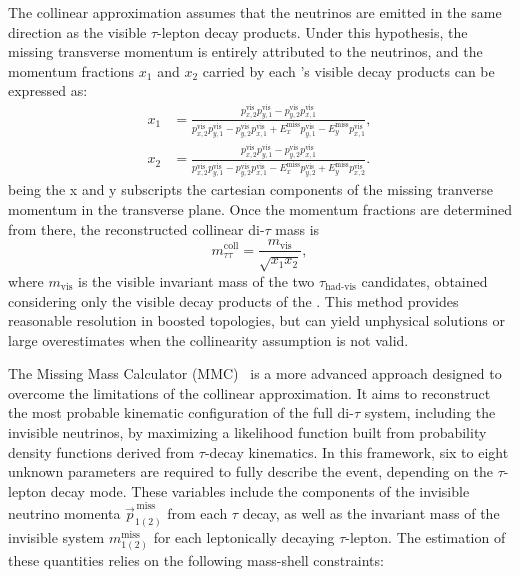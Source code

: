 The collinear approximation assumes that the neutrinos are emitted in the same direction as the visible $\tau$-lepton decay products. Under this hypothesis, the missing transverse momentum is entirely attributed to the neutrinos, and the momentum fractions $x_1$ and $x_2$ carried by each \taul's visible decay products can be expressed as: 
\begin{align}
    x_{1} &= 
    \frac{p_{x,2}^{\text{vis}} p_{y,1}^{\text{vis}} - p_{y,2}^{\text{vis}} p_{x,1}^{\text{vis}}}
         {p_{x,2}^{\text{vis}} p_{y,1}^{\text{vis}} - p_{y,2}^{\text{vis}} p_{x,1}^{\text{vis}} 
          + E_{x}^{\text{miss}} p_{y,1}^{\text{vis}} - E_{y}^{\text{miss}} p_{x,1}^{\text{vis}}}, \nonumber \\[8pt]
    x_{2} &= 
    \frac{p_{x,2}^{\text{vis}} p_{y,1}^{\text{vis}} - p_{y,2}^{\text{vis}} p_{x,1}^{\text{vis}}}
         {p_{x,2}^{\text{vis}} p_{y,1}^{\text{vis}} - p_{y,2}^{\text{vis}} p_{x,1}^{\text{vis}} 
          - E_{x}^{\text{miss}} p_{y,2}^{\text{vis}} + E_{y}^{\text{miss}} p_{x,2}^{\text{vis}}}.
    \end{align}
being the x and y subscripts the cartesian components of the missing tranverse momentum in the transverse plane. Once the momentum fractions are determined from there, the reconstructed collinear di-$\tau$ mass is
\begin{equation}
m_{\tau\tau}^{\text{coll}} = \frac{m_{\text{vis}}}{\sqrt{x_{1}x_{2}}},
\label{eq:mcoll}
\end{equation}
where $m_{\text{vis}}$ is the visible invariant mass of the two $\tau_{\text{had-vis}}$ candidates, obtained considering only the visible decay products of the \taul. This method provides reasonable resolution in boosted topologies, but can yield unphysical solutions or large overestimates when the collinearity assumption is not valid.  

The Missing Mass Calculator (MMC)~\cite{Elagin_2011} is a more advanced approach designed to overcome the limitations of the collinear approximation. It aims to reconstruct the most probable kinematic configuration of the full di-$\tau$ system, including the invisible neutrinos, by maximizing a likelihood function built from probability density functions derived from $\tau$-decay kinematics. In this framework, six to eight unknown parameters are required to fully describe the event, depending on the $\tau$-lepton decay mode. These variables include the components of the invisible neutrino momenta $\vec{p}^{\,\text{miss}}_{1(2)}$ from each $\tau$ decay, as well as the invariant mass of the invisible system $m^{\text{miss}}_{1(2)}$ for each leptonically decaying $\tau$-lepton. The estimation of these quantities relies on the following mass-shell constraints:

